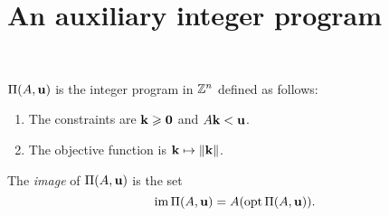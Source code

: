 \documentclass[11pt]{amsart}
\begin{document}
\newpage
\section{An auxiliary integer program}

\

\begin{definition}
$\Pi(A, \mathbf{u})$ is the integer program in $\mathbb{Z}^n$ defined as follows:
\begin{enumerate}
\item The constraints are $\mathbf{k} \geqslant \mathbf{0}$ and $A \mathbf{k} < \mathbf{u}$. 
\item The objective function is $\mathbf{k} \mapsto \| \mathbf{k} \|$.
\end{enumerate}
\end{definition}

\begin{definition}
The \emph{image} of $\Pi(A, \mathbf{u})$ is the set \[ \operatorname{im} \Pi(A, \mathbf{u}) = A ( \operatorname{opt} \Pi(A, \mathbf{u}) ). \] 
\end{definition}

\end{document}
